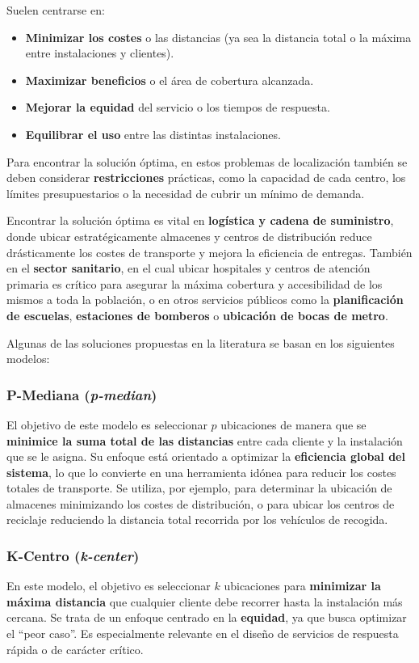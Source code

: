 \documentclass[12pt,a4paper]{book}
\begin{document}
Suelen centrarse en:
\begin{itemize}
    \item \textbf{Minimizar los costes} o las distancias (ya sea la distancia total o la máxima entre instalaciones y clientes).
    \item \textbf{Maximizar beneficios} o el área de cobertura alcanzada.
    \item \textbf{Mejorar la equidad} del servicio o los tiempos de respuesta.
    \item \textbf{Equilibrar el uso} entre las distintas instalaciones.
\end{itemize}

Para encontrar la solución óptima, en estos problemas de localización también se deben considerar \textbf{restricciones} prácticas, como la capacidad de cada centro, los límites presupuestarios o la necesidad de cubrir un mínimo de demanda.

Encontrar la solución óptima es vital en \textbf{logística y cadena de suministro}, donde ubicar estratégicamente almacenes y centros
de distribución reduce drásticamente los costes de transporte y mejora la eficiencia de entregas. También en el \textbf{sector sanitario}, en el cual ubicar hospitales y centros de atención primaria es crítico para
asegurar la máxima cobertura y accesibilidad de los mismos a toda la población, o en otros servicios públicos como la \textbf{planificación de escuelas}, \textbf{estaciones de bomberos} o \textbf{ubicación de bocas de metro}.

Algunas de las soluciones propuestas en la literatura se basan en los siguientes modelos:

\subsubsection{P-Mediana (\textit{p-median})}
El objetivo de este modelo es seleccionar $p$ ubicaciones de manera que se \textbf{minimice la suma total de las distancias} entre cada cliente y la instalación que se le asigna. Su enfoque está orientado a optimizar la \textbf{eficiencia global del sistema}, lo que lo convierte en una herramienta idónea para reducir los costes totales de transporte.
Se utiliza, por ejemplo, para determinar la ubicación de almacenes minimizando los costes de distribución, o para ubicar los centros de reciclaje reduciendo la distancia total recorrida por los vehículos de recogida.

\subsubsection{K-Centro (\textit{k-center})}
En este modelo, el objetivo es seleccionar $k$ ubicaciones para \textbf{minimizar la máxima distancia} que cualquier cliente debe recorrer hasta la instalación más cercana. Se trata de un enfoque centrado en la \textbf{equidad}, ya que busca optimizar el ``peor caso''. Es especialmente relevante en el diseño de servicios de respuesta rápida o de carácter crítico.
\end{document}

